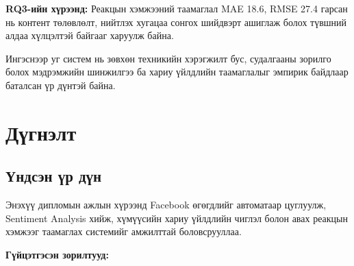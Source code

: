 \documentclass[12pt,a4paper]{report}
\begin{document}
\textbf{RQ3-ийн хүрээнд:} Реакцын хэмжээний таамаглал MAE 18.6, RMSE 27.4 гарсан нь контент төлөвлөлт, нийтлэх хугацаа сонгох шийдвэрт ашиглаж болох түвшний алдаа хүлцэлтэй байгааг харуулж байна.

Ингэснээр уг систем нь зөвхөн техникийн хэрэгжилт бус, судалгааны зорилго болох мэдрэмжийн шинжилгээ ба хариу үйлдлийн таамаглалыг эмпирик байдлаар баталсан үр дүнтэй байна.

\chapter{Дүгнэлт}

\section{Үндсэн үр дүн}

Энэхүү дипломын ажлын хүрээнд Facebook өгөгдлийг автоматаар цуглуулж, Sentiment Analysis хийж, хүмүүсийн хариу үйлдлийн чиглэл болон авах реакцын хэмжээг таамаглах системийг амжилттай боловсрууллаа.

\textbf{Гүйцэтгэсэн зорилтууд:}
\end{document}
